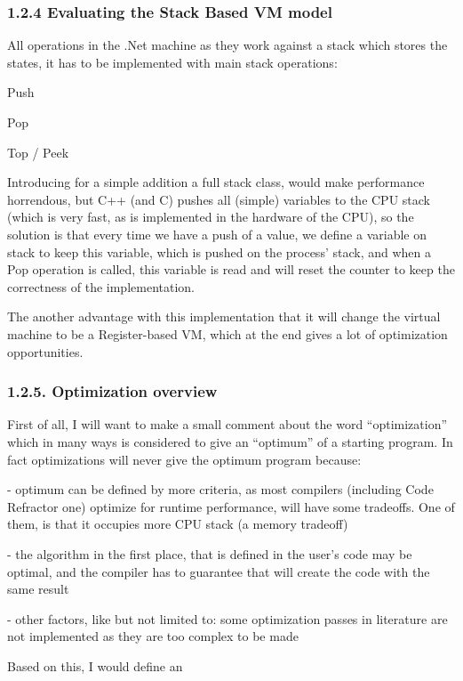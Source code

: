 \documentclass[letterpaper]{article}
\begin{document}
\subsubsection[1.2.4 Evaluating the Stack Based VM model]{1.2.4 Evaluating the Stack Based VM model}
All operations in the .Net machine as they work against a stack which stores the states, it has to be implemented with
main stack operations: 

Push

Pop

Top / Peek


\bigskip

Introducing for a simple addition a full stack class, would make performance horrendous, but C++ (and C) pushes all
(simple) variables to the CPU stack (which is very fast, as is implemented in the hardware of the CPU), so the solution
is that every time we have a push of a value, we define a variable on stack to keep this variable, which is pushed on
the process' stack, and when a Pop operation is called, this variable is read and will reset the counter to keep the
correctness of the implementation.

The another advantage with this implementation that it will change the virtual machine to be a Register-based VM, which
at the end gives a lot of optimization opportunities. 


\bigskip

\subsubsection{1.2.5. Optimization overview }
First of all, I will want to make a small comment about the word ``optimization'' which in many ways is considered to
give an ``optimum'' of a starting program. In fact optimizations will never give the optimum program because:

{}- optimum can be defined by more criteria, as most compilers (including Code Refractor one) optimize for runtime
performance, will have some tradeoffs. One of them, is that it occupies more CPU stack (a memory tradeoff)

{}- the algorithm in the first place, that is defined in the user's code may be optimal, and the compiler has to
guarantee that will create the code with the same result

{}- other factors, like but not limited to: some optimization passes in literature are not implemented as they are too
complex to be made

Based on this, I would define an 
\end{document}
